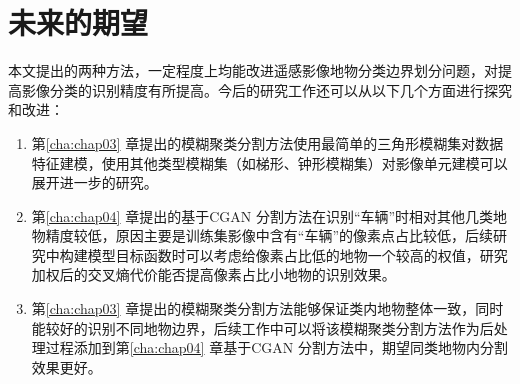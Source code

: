 \section{未来的期望}
\label{sec:5-2}
本文提出的两种方法，一定程度上均能改进遥感影像地物分类边界划分问题，对提高影像分类的识别精度有所提高。今后的研究工作还可以从以下几个方面进行探究和改进：
\begin{enumerate}[(1)]
  \item  第\ref{cha:chap03} 章提出的模糊聚类分割方法使用最简单的三角形模糊集对数据特征建模，使用其他类型模糊集（如梯形、钟形模糊集）对影像单元建模可以展开进一步的研究。
  \item  第\ref{cha:chap04} 章提出的基于CGAN 分割方法在识别“车辆”时相对其他几类地物精度较低，原因主要是训练集影像中含有“车辆”的像素点占比较低，后续研究中构建模型目标函数时可以考虑给像素占比低的地物一个较高的权值，研究加权后的交叉熵代价能否提高像素占比小地物的识别效果。
  \item  第\ref{cha:chap03} 章提出的模糊聚类分割方法能够保证类内地物整体一致，同时能较好的识别不同地物边界，后续工作中可以将该模糊聚类分割方法作为后处理过程添加到第\ref{cha:chap04} 章基于CGAN 分割方法中，期望同类地物内分割效果更好。
  
\end{enumerate}